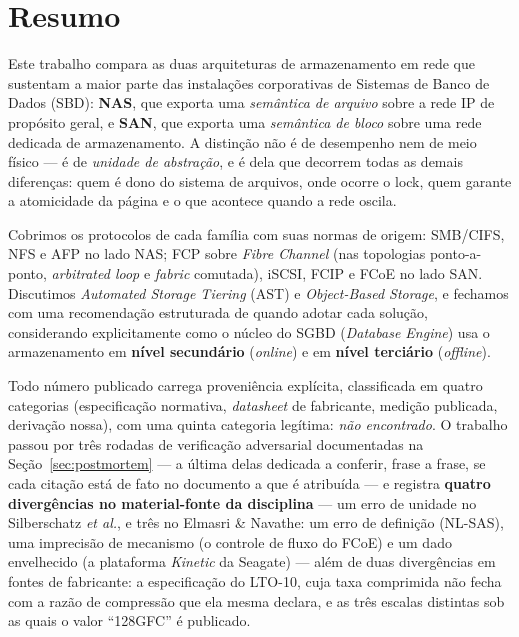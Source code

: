 \documentclass[11pt,a4paper]{article}
\begin{document}
\section*{Resumo}

Este trabalho compara as duas arquiteturas de armazenamento em rede que sustentam a maior parte
das instalações corporativas de Sistemas de Banco de Dados (SBD): \textbf{NAS}, que exporta uma
\emph{semântica de arquivo} sobre a rede IP de propósito geral, e \textbf{SAN}, que exporta uma
\emph{semântica de bloco} sobre uma rede dedicada de armazenamento. A distinção não é de
desempenho nem de meio físico --- é de \emph{unidade de abstração}, e é dela que decorrem todas as
demais diferenças: quem é dono do sistema de arquivos, onde ocorre o lock, quem garante a
atomicidade da página e o que acontece quando a rede oscila.

Cobrimos os protocolos de cada família com suas normas de origem: SMB/CIFS, NFS e AFP no lado NAS;
FCP sobre \textit{Fibre Channel} (nas topologias ponto-a-ponto, \textit{arbitrated loop} e
\textit{fabric} comutada), iSCSI, FCIP e FCoE no lado SAN. Discutimos \textit{Automated Storage
Tiering} (AST) e \textit{Object-Based Storage}, e fechamos com uma recomendação estruturada de
quando adotar cada solução, considerando explicitamente como o núcleo do SGBD (\textit{Database
Engine}) usa o armazenamento em \textbf{nível secundário} (\textit{online}) e em \textbf{nível
terciário} (\textit{offline}).

Todo número publicado carrega proveniência explícita, classificada em quatro categorias
(especificação normativa, \textit{datasheet} de fabricante, medição publicada, derivação nossa),
com uma quinta categoria legítima: \emph{não encontrado}. O trabalho passou por três rodadas de
verificação adversarial documentadas na Seção~\ref{sec:postmortem} --- a última delas dedicada a
conferir, frase a frase, se cada citação está de fato no documento a que é atribuída --- e registra
\textbf{quatro divergências no material-fonte da disciplina} --- um erro de unidade no Silberschatz
\textit{et al.}, e três no Elmasri \& Navathe: um erro de definição (NL-SAS), uma imprecisão de
mecanismo (o controle de fluxo do FCoE) e um dado envelhecido (a plataforma \textit{Kinetic} da
Seagate) --- além de duas divergências em fontes de fabricante: a especificação do LTO-10, cuja taxa comprimida não fecha com a razão de
compressão que ela mesma declara, e as três escalas distintas sob as quais o valor ``128GFC'' é
publicado.
\end{document}
